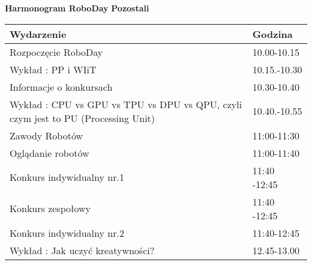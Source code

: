\documentclass{article}
\begin{document}
\begin{center}
\Large\textbf{Harmonogram RoboDay}
\large\textbf{Pozostali}
\end{center}
\vspace{1cm}
\begin{center}
\begin{tabular}{|l|l|}
\hline
\textbf{Wydarzenie} & \textbf{Godzina} \\
\hline
Rozpoczęcie RoboDay & 10.00-10.15 \\
\hline
Wykład : PP i WIiT & 10.15.-10.30 \\
\hline
Informacje o konkursach & 10.30-10.40 \\
\hline
Wykład : CPU vs GPU vs TPU vs DPU vs QPU, czyli czym jest to PU (Processing Unit) & 10.40.-10.55 \\
\hline
Zawody Robotów & 11:00-11:30 \\
\hline
Oglądanie robotów & 11:00-11:40 \\
\hline
Konkurs indywidualny nr.1 & 11:40 -12:45 \\
\hline
Konkurs zespołowy & 11:40 -12:45 \\
\hline
Konkurs indywidualny nr.2 & 11:40-12:45 \\
\hline
Wykład : Jak uczyć kreatywności? & 12.45-13.00 \\
\hline
\end{tabular}
\end{center}
\end{document}
